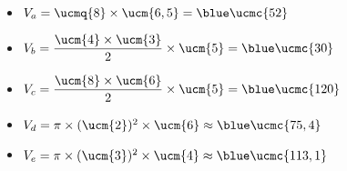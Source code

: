    \begin{itemize}
      \item $V_a =\ucmq{8}\times\ucm{6,5} ={\blue \ucmc{52}}$ \smallskip
      \item $V_b =\dfrac{\ucm{4}\times\ucm{3}}{2}\times\ucm{5} ={\blue \ucmc{30}}$ \smallskip
      \item $V_c =\dfrac{\ucm{8}\times\ucm{6}}{2}\times\ucm{5} ={\blue \ucmc{120}}$ \smallskip
      \item $V_d =\pi\times(\ucm{2})^2\times\ucm{6} \approx{\blue \ucmc{75,4}}$ \smallskip
      \item $V_e =\pi\times(\ucm{3})^2\times\ucm{4} \approx{\blue \ucmc{113,1}}$
   \end{itemize}
